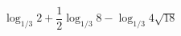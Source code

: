 \begin{ex}[type=calculate]
	\begin{condition}
		\( \log_{1/3}2+\dfrac{1}{2}\log_{1/3}8-\log_{1/3}4\sqrt{18} \)
	\end{condition}
\end{ex}